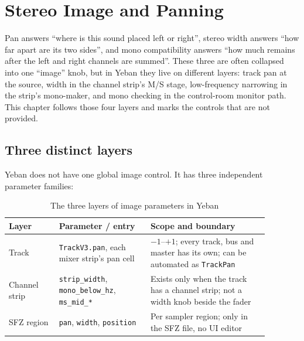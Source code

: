 \chapter{Stereo Image and Panning}
\label{chap:stereo-image}


Pan answers ``where is this sound placed left or right'', stereo width answers ``how far apart are its two sides'', and mono compatibility answers ``how much remains after the left and right channels are summed''. These three are often collapsed into one ``image'' knob, but in Yeban they live on different layers: track pan at the source, width in the channel strip's M/S stage, low-frequency narrowing in the strip's mono-maker, and mono checking in the control-room monitor path. This chapter follows those four layers and marks the controls that are not provided.

\section{Three distinct layers}

Yeban does not have one global image control. It has three independent parameter families:

\begin{table}[htbp]
\centering
\small
\begin{tabular}{@{}p{0.17\linewidth}p{0.31\linewidth}p{0.40\linewidth}@{}}
\hline
Layer & Parameter / entry & Scope and boundary \\
\hline
Track & \texttt{TrackV3.pan}, each mixer strip's pan cell & $-1$--$+1$; every track, bus and master has its own; can be automated as \texttt{TrackPan} \\
Channel strip & \texttt{strip\_width}, \texttt{mono\_below\_hz}, \texttt{ms\_mid\_*} & Exists only when the track has a channel strip; not a width knob beside the fader \\
SFZ region & \texttt{pan}, \texttt{width}, \texttt{position} & Per sampler region; only in the SFZ file, no UI editor \\
\hline
\end{tabular}
\caption{The three layers of image parameters in Yeban}
\label{tab:stereo-layers}
\end{table}

